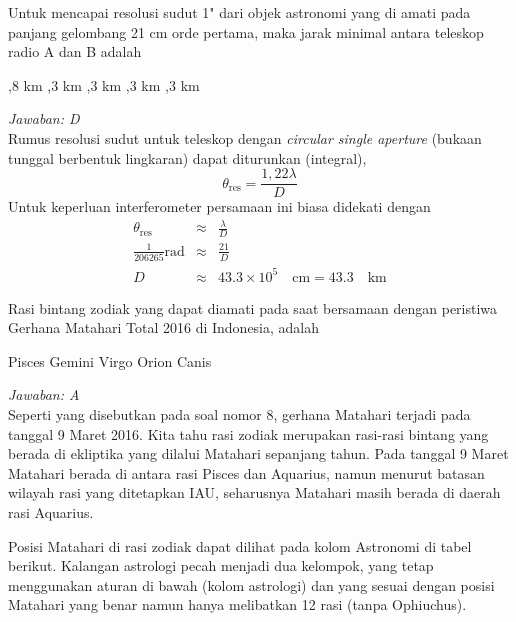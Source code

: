 \documentclass[11pt,fleqn, a4paper]{exam}
\begin{document}
\begin{questions}
Untuk mencapai resolusi sudut 1" dari objek astronomi yang di amati pada panjang gelombang 21 cm orde pertama, maka jarak minimal antara teleskop radio A dan B adalah
\begin{choices}
,8 km 
,3 km
,3 km
,3 km
,3 km
\end{choices}

\textit{Jawaban: D}\\
Rumus resolusi sudut untuk teleskop dengan \textit{circular single aperture} (bukaan tunggal berbentuk lingkaran) dapat diturunkan (integral),
\begin{equation*}
\theta_{\text{res}} = \frac{1,22 \lambda}{D}
\end{equation*}
Untuk keperluan interferometer persamaan ini biasa didekati dengan
\begin{eqnarray*}
\theta_{\text{res}} &\approx& \frac{\lambda}{D}\\
\frac{1}{206265} \text{rad} &\approx&  \frac{21}{D}\\
D &\approx& 43.3 \times 10^5 \quad \text{cm} = 43.3 \quad \text{km}
\end{eqnarray*}

\vspace{0.5cm}
\question Rasi bintang zodiak yang dapat diamati pada saat bersamaan dengan peristiwa Gerhana Matahari Total 2016  di Indonesia, adalah
\begin{choices}
\choice Pisces
\choice Gemini
\choice Virgo
\choice Orion
\choice Canis
\end{choices}

\textit{Jawaban: A}\\
Seperti yang disebutkan pada soal nomor 8, gerhana Matahari terjadi pada tanggal 9 Maret 2016. Kita tahu rasi zodiak merupakan rasi-rasi bintang yang berada di ekliptika yang dilalui Matahari sepanjang tahun. Pada tanggal 9 Maret Matahari berada di antara rasi Pisces dan Aquarius, namun menurut  batasan wilayah rasi yang ditetapkan IAU, seharusnya Matahari masih berada di daerah rasi Aquarius. 

Posisi Matahari di rasi zodiak dapat dilihat pada kolom Astronomi di tabel berikut. Kalangan astrologi pecah menjadi dua kelompok, yang tetap menggunakan aturan di bawah (kolom astrologi) dan yang sesuai dengan posisi Matahari yang benar namun hanya melibatkan 12 rasi (tanpa Ophiuchus).


\end{questions}
\end{document}
